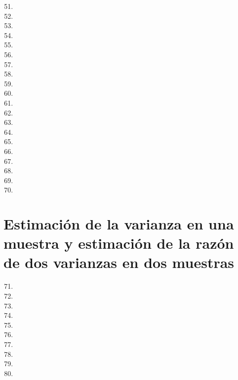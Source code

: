 \documentclass[a4paper,11pt]{article}
\theoremstyle{teoremas}
\theoremstyle{ejemplos}
\theoremstyle{definiciones}
\theoremstyle{lemas}
\begin{document}
\begin{enumerate}
 \setcounter{enumi}{50}
 \item 
 \item 
 \item 
 \item 
 \item 
 \item 
 \item 
 \item 
 \item 
 \item 
 \item 
 \item 
 \item 
 \item 
 \item 
 \item 
 \item 
 \item 
 \item 
 \item 
\end{enumerate}

\newpage

\section{Estimaci\'on de la varianza  en una muestra y estimaci\'on de la raz\'on de dos varianzas en dos muestras}
 
\begin{enumerate}
 \setcounter{enumi}{70}
 \item 
 \item 
 \item 
 \item 
 \item 
 \item 
 \item 
 \item 
 \item 
 \item 
\end{enumerate}
\end{document}
